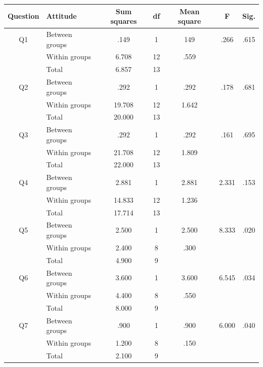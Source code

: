 \documentclass[a4paper]{article}
\begin{document}
\begin{center}
  \begin{tabular}{| c | l | c | c | c | c | c |}
    \hline
    Question & Attitude & Sum squares & df & Mean square & F & Sig. \\ \hline
    
    Q1 & Between groups & .149 & 1 & 149 & .266 & .615  \\ \hline
    & Within groups & 6.708 & 12 & .559 &  &  \\ \hline
    & Total & 6.857 & 13 &  &  &  \\ \hline


    Q2 & Between groups & .292 & 1 & .292 & .178 & .681  \\ \hline
    & Within groups & 19.708 & 12 & 1.642 & &  \\ \hline
    & Total & 20.000 & 13 &  &  &  \\ \hline

    Q3 & Between groups & .292 & 1 & .292 & .161 & .695 \\ \hline
    & Within groups & 21.708 & 12 & 1.809 & &  \\ \hline
    & Total & 22.000 & 13 &  &  &  \\ \hline

    Q4 & Between groups & 2.881 & 1 & 2.881 & 2.331 & .153 \\ \hline
    & Within groups & 14.833 & 12 & 1.236 & &  \\ \hline
    & Total & 17.714 & 13 &  &  &  \\ \hline

    Q5 & Between groups & 2.500 & 1 & 2.500 & 8.333 & .020 \\ \hline
    & Within groups & 2.400 & 8 & .300 &  &  \\ \hline
    & Total & 4.900 & 9 &  &  &  \\ \hline

    Q6 & Between groups & 3.600 & 1 & 3.600 & 6.545 & .034 \\ \hline
    & Within groups & 4.400 & 8 & .550 &  &  \\ \hline
    & Total & 8.000 & 9 &  &  &  \\ \hline

    Q7 & Between groups & .900 & 1 & .900 & 6.000 & .040 \\ \hline
    & Within groups & 1.200 & 8 & .150 &  &  \\ \hline
    & Total & 2.100 & 9 &  & &  \\ \hline

  \end{tabular}
\end{center}
\end{document}
